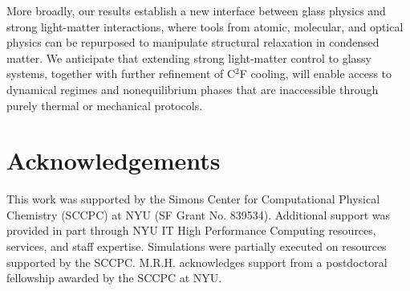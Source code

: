 \documentclass[aps, prl,
 reprint,
 superscriptaddress,
 citeautoscript,  %
 amsmath,amssymb,
 tightenlines
]{revtex4-2}
\begin{document}
More broadly, our results establish a new interface between glass physics and strong light-matter interactions, where tools from atomic, molecular, and optical physics can be repurposed to manipulate structural relaxation in condensed matter. We anticipate that extending strong light-matter control to glassy systems, together with further refinement of C$^2$F cooling, will enable access to dynamical regimes and nonequilibrium phases that are inaccessible through purely thermal or mechanical protocols.


\section*{Acknowledgements}

This work was supported by the Simons Center for Computational Physical Chemistry (SCCPC) at NYU (SF Grant No. 839534). Additional support was provided in part through NYU IT High Performance Computing resources, services, and staff expertise. Simulations were partially executed on resources supported by the SCCPC. M.R.H. acknowledges support from a postdoctoral fellowship awarded by the SCCPC at NYU.









\end{document}
